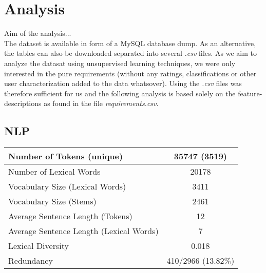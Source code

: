 \section{Analysis}
Aim of the analysis... \\

The \crowdre{} dataset is available in form of a MySQL database dump. As an alternative, the tables can also be downloaded separated into several \textit{.csv} files. As we aim to analyze the datasat using unsupervised learning techniques, we were only interested in the pure requirements (without any ratings, classifications or other user characterization added to the data whatsover). Using the \textit{.csv} files was therefore sufficient for us and the following analysis is based solely on the feature-descriptions as found in the file \textit{requirements.csv}.

\subsection{NLP}
\begin{tabular}{ | l | c | }
\hline
Number of Tokens (unique) & 35747 (3519) \\ \hline
Number of Lexical Words & 20178 \\ \hline
Vocabulary Size (Lexical Words) & 3411 \\ \hline
Vocabulary Size (Stems) & 2461 \\ \hline
Average Sentence Length (Tokens) & 12 \\ \hline
Average Sentence Length (Lexical Words) & 7 \\ \hline
Lexical Diversity & 0.018 \\ \hline
Redundancy\footnotemark & 410/2966 (13.82\%) \\ \hline
\end{tabular}
